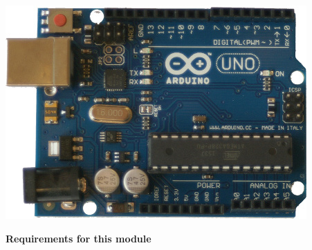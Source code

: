\documentclass{arduino}
\begin{document}
\includegraphics[width=\linewidth]{1. Arduino}

\textbf{Requirements for this module}
\end{document}

